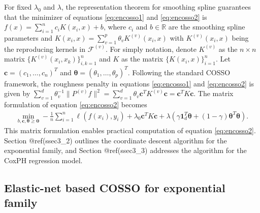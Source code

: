 For fixed \(\lambda_0\) and \(\lambda\), the representation theorem for smoothing spline guarantees that the minimizer of equations \eqref{eq:encosso1} and \eqref{eq:encosso2} is \(f(x) = \sum_{i=1}^{n} c_i K(x_i, x) + b\), where \(c_i\) and \(b \in \mathbb{R}\) are the smoothing spline parameters and \(K(x_i, x) = \sum_{v=1}^{p} \theta_v K^{(v)}(x_i, x)\) with \(K^{(v)}(x_i, x)\) being the reproducing kernels in \(\mathcal{F}^{(v)}\). For simply notation, denote \(K^{(v)}\) as the \(n \times n\) matrix \(\{ K^{(v)}(x_i, x_k) \}_{i,k=1}^n\) and \(K\) as the matrix \(\{ K(x_i, x) \}_{i=1}^{n}\). Let \(\pmb{c} = (c_1, \dots, c_n)^T\) and \(\pmb{\theta} = (\theta_1, \dots, \theta_p)^T\). Following the standard COSSO framework, the roughness penalty in equations \eqref{eq:encosso1} and \eqref{eq:encosso2} is given by \(\sum_{v=1}^{d}\theta_v^{-1} \| {P^{(v)} f} \|^2 = \sum_{v=1}^{d} \theta_v \pmb{c}^T K^{(v)} \pmb{c} = \pmb{c}^T K \pmb{c}\). The matrix formulation of equation \eqref{eq:encosso2} becomes
\begin{align}
    \min_{b, \pmb{c}, \pmb{\theta} \geq \pmb{0}}
    -\frac{1}{n}\sum_{i=1}^{n}\ell(f(x_i), y_i)
    + \lambda_0 \pmb{c}^T K \pmb{c}
    + \lambda (\gamma \pmb{1}_d^T \pmb{\theta} + (1-\gamma) \pmb{\theta}^T \pmb{\theta}).
    \label{eq:glmcosso} 
\end{align}
This matrix formulation enables practical computation of equation \eqref{eq:encosso2}. Section @ref(ssec3\_2) outlines the coordinate descent algorithm for the exponential family, and Section @ref(ssec3\_3) addresses the algorithm for the CoxPH regression model.

\hypertarget{ssec3_2}{%
\subsection{Elastic-net based COSSO for exponential family}\label{ssec3_2}}

